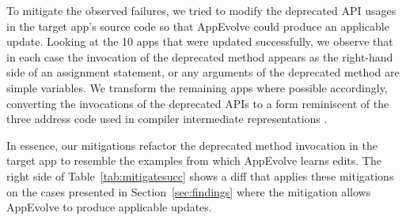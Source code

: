 To mitigate the observed failures, we tried to modify the deprecated API
usages in the target app's source code so that AppEvolve could produce an
applicable update. Looking at the 10 apps that were updated successfully,
we observe that in each case the invocation of the deprecated method
appears as the right-hand side of an assignment statement, or any
arguments of the deprecated method are simple variables.
We transform the remaining apps where possible accordingly, converting the
invocations of the deprecated APIs to a form reminiscent of the three
address code used in compiler intermediate representations \cite{dragon}.

In essence, our mitigations refactor the deprecated method invocation in
the target app to resemble the examples from which AppEvolve learns
edits. 
The right side of Table~\ref{tab:mitigatesucc} shows a diff that applies
these mitigations on the cases presented in Section~\ref{sec:findings}
where the mitigation allows AppEvolve to produce applicable updates.

